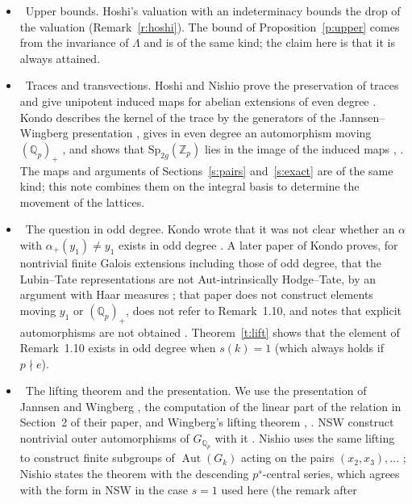 \documentclass[11pt,a4paper]{article}
\newcommand{\Zp}{\mathbb{Z}_p}
\newcommand{\Qp}{\mathbb{Q}_p}
\newcommand{\Aut}{\operatorname{Aut}}
\newcommand{\Sp}{\mathrm{Sp}}
\newcommand{\lab}[2]{{\upshape\fcolorbox{#1}{#1!8}{\scriptsize\sffamily\bfseries\textcolor{#1}{#2}}}}
\newcommand{\tagS}{\lab{blue}{S}}
\theoremstyle{plain}
\theoremstyle{definition}
\theoremstyle{remark}
\begin{document}
\begin{itemize}
\cite[Ex.~3.5.1(ii)]{EssLgc} (Remark~\ref{r:EssLgc}).
\item \tagS\ Upper bounds. Hoshi's valuation with an indeterminacy \cite[Prop.~1.10(ii)]{HoshiTop} bounds the drop of
the valuation (Remark~\ref{r:hoshi}). The bound of Proposition~\ref{p:upper} comes from the invariance of $\Lambda$
and is of the same kind; the claim here is that it is always attained.
\item \tagS\ Traces and transvections. Hoshi and Nishio prove the preservation of traces and give unipotent induced maps
for abelian extensions of even degree \cite[Lemma~2.3(ii), Thm.~1.5]{HN}. Kondo describes the kernel of the trace by
the generators of the Jannsen--Wingberg presentation \cite[Thm.~1.3]{Kondo}, gives in even degree an automorphism
moving $(\Qp)_+$ \cite[Lemma~1.5]{Kondo}, and shows that $\Sp_{2g}(\Zp)$ lies in the image of the induced maps
\cite[proof of Thm.~2.19]{Kondo}, \cite[Lemma~3.3]{Kondo26}. The maps and arguments of Sections~\ref{s:pairs}
and~\ref{s:exact} are of the same kind; this note combines them on the integral basis to determine the movement of
the lattices.
\item \tagS\ The question in odd degree. Kondo wrote that it was not clear whether an $\alpha$ with
$\alpha_+(y_1)\ne y_1$ exists in odd degree \cite[introduction, Rem.~1.10]{Kondo}. A later paper of Kondo proves, for
nontrivial finite Galois extensions including those of odd degree, that the Lubin--Tate representations are not
Aut-intrinsically Hodge--Tate, by an argument with Haar measures \cite[Thms.~C, D]{Kondo26}; that paper does not
construct elements moving $y_1$ or $(\Qp)_+$, does not refer to Remark~1.10, and notes that explicit automorphisms are
not obtained \cite[remark after Thm.~D, Rem.~3.7]{Kondo26}. Theorem~\ref{t:lift} shows that the element of
Remark~1.10 exists in odd degree when $s(k)=1$ (which always holds if $p\nmid e$).
\item \tagS\ The lifting theorem and the presentation. We use the presentation of Jannsen and Wingberg \cite{JW}, the
computation of the linear part of the relation in Section~2 of their paper, and Wingberg's lifting theorem
\cite[Satz~2]{Wi}, \cite[Thm.~7.5.15]{NSW}. NSW construct nontrivial outer automorphisms of $G_{\Qp}$ with it
\cite[pp.~421--423]{NSW}. Nishio uses the same lifting to construct finite subgroups of $\Aut(G_k)$ acting on the pairs
$(x_2,x_3),\dots$ \cite[Prop.~2.6, Thm.~2.8]{Nishio26}; Nishio states the theorem with the descending
$p^s$-central series, which agrees with the form in NSW in the case $s=1$ used here (the remark after

\end{itemize}
\end{document}

